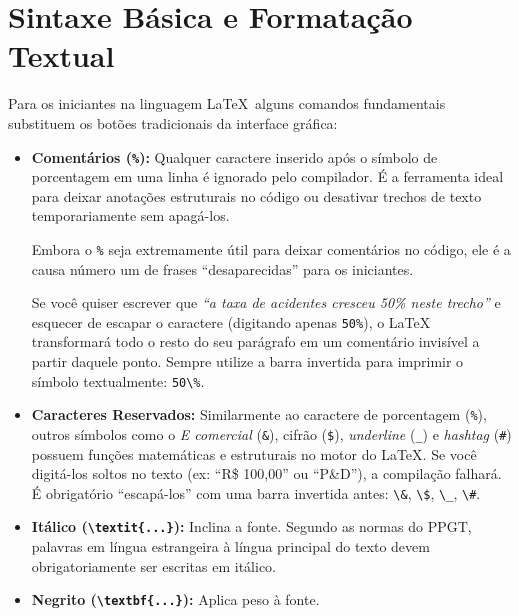 \documentclass[12pt, a4paper]{article}
\begin{document}
\section{Sintaxe Básica e Formatação Textual}

Para os iniciantes na linguagem \LaTeX \, alguns comandos fundamentais substituem os botões tradicionais da interface gráfica:

\begin{itemize}
    \item \textbf{Comentários (\texttt{\%}):} Qualquer caractere inserido após o símbolo de porcentagem em uma linha é ignorado pelo compilador. É a ferramenta ideal para deixar anotações estruturais no código ou desativar trechos de texto temporariamente sem apagá-los.
    
    \begin{atencao}
    Embora o \texttt{\%} seja extremamente útil para deixar comentários no código, ele é a causa número um de frases ``desaparecidas'' para os iniciantes. 

    Se você quiser escrever que \textit{``a taxa de acidentes cresceu 50\% neste trecho''} e esquecer de escapar o caractere (digitando apenas \texttt{50\%}), o LaTeX transformará todo o resto do seu parágrafo em um comentário invisível a partir daquele ponto. Sempre utilize a barra invertida para imprimir o símbolo textualmente: \texttt{50\textbackslash\%}.
    \end{atencao}
    
    \item \textbf{Caracteres Reservados:} Similarmente ao caractere de porcentagem (\texttt{\%}), outros símbolos como o \textit{E comercial} (\texttt{\&}), cifrão (\texttt{\$}), \textit{underline} (\texttt{\_}) e \textit{hashtag} (\texttt{\#}) possuem funções matemáticas e estruturais no motor do \LaTeX. Se você digitá-los soltos no texto (ex: ``R\$ 100,00'' ou ``P\&D''), a compilação falhará. É obrigatório ``escapá-los'' com uma barra invertida antes: \texttt{\textbackslash\&}, \texttt{\textbackslash\$}, \texttt{\textbackslash\_}, \texttt{\textbackslash\#}.

    \item \textbf{Itálico (\texttt{\textbackslash textit\{...\}}):} Inclina a fonte. Segundo as normas do PPGT, palavras em língua estrangeira à língua principal do texto devem obrigatoriamente ser escritas em itálico.
    \item \textbf{Negrito (\texttt{\textbackslash textbf\{...\}}):} Aplica peso à fonte. 
    

\end{itemize}
\end{document}

